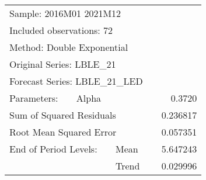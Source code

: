 \begin{tabular}{lrrrr}
\toprule
\multicolumn{3}{l}{Sample: 2016M01 2021M12}&\multicolumn{1}{c}{}&\multicolumn{1}{c}{}\\
\multicolumn{3}{l}{Included observations: 72}&\multicolumn{1}{c}{}&\multicolumn{1}{c}{}\\
\multicolumn{3}{l}{Method: Double Exponential}&\multicolumn{1}{c}{}&\multicolumn{1}{c}{}\\
\multicolumn{3}{l}{Original Series: LBLE\_21}&\multicolumn{1}{c}{}&\multicolumn{1}{c}{}\\
\multicolumn{3}{l}{Forecast Series: LBLE\_21\_LED}&\multicolumn{1}{c}{}&\multicolumn{1}{c}{}\\
\midrule
\multicolumn{1}{l}{Parameters:}&\multicolumn{1}{l}{Alpha}&\multicolumn{1}{c}{}&\multicolumn{1}{c}{}&\multicolumn{1}{r}{0.3720}\\
\multicolumn{3}{l}{Sum of Squared Residuals}&\multicolumn{1}{c}{}&\multicolumn{1}{r}{0.236817}\\
\multicolumn{3}{l}{Root Mean Squared Error}&\multicolumn{1}{c}{}&\multicolumn{1}{r}{0.057351}\\
\midrule
\multicolumn{2}{l}{End of Period Levels:}&\multicolumn{1}{l}{Mean}&\multicolumn{1}{c}{}&\multicolumn{1}{r}{5.647243}\\
\multicolumn{1}{c}{}&\multicolumn{1}{c}{}&\multicolumn{1}{l}{Trend}&\multicolumn{1}{c}{}&\multicolumn{1}{r}{0.029996}\\
\bottomrule
\end{tabular}